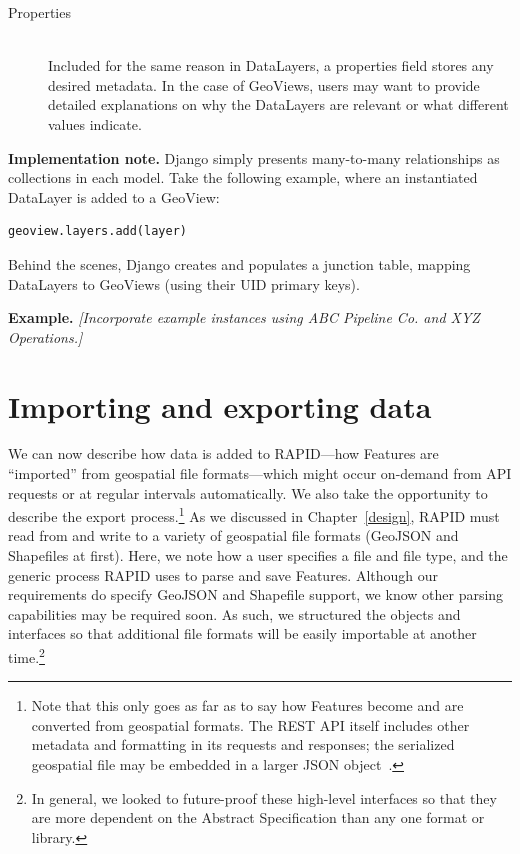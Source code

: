 \begin{description}
\item[Properties] \hfill \\
Included for the same reason in DataLayers, a properties field stores any desired metadata. In the case of GeoViews, users may want to provide detailed explanations on why the DataLayers are relevant or what different values indicate.

\end{description}

\textbf{Implementation note.} Django simply presents many-to-many relationships as collections in each model. Take the following example, where an instantiated DataLayer is added to a GeoView:

\begin{Verbatim}[samepage=true,baselinestretch=1,xleftmargin=12mm]
geoview.layers.add(layer)
\end{Verbatim}

Behind the scenes, Django creates and populates a junction table, mapping DataLayers to GeoViews (using their UID primary keys).

\textbf{Example.} \textit{[Incorporate example instances using ABC Pipeline Co. and XYZ Operations.]}

\section{Importing and exporting data}
We can now describe how data is added to RAPID---how Features are ``imported'' from geospatial file formats---which might occur on-demand from API requests or at regular intervals automatically. We also take the opportunity to describe the export process.\footnote{Note that this only goes as far as to say how Features become and are converted from geospatial formats. The REST API itself includes other metadata and formatting in its requests and responses; the serialized geospatial file may be embedded in a larger JSON object~\cite{Francis}.} As we discussed in Chapter~\ref{design}, RAPID must read from and write to a variety of geospatial file formats (GeoJSON and Shapefiles at first). Here, we note how a user specifies a file and file type, and the generic process RAPID uses to parse and save Features. Although our requirements do specify GeoJSON and Shapefile support, we know other parsing capabilities may be required soon. As such, we structured the objects and interfaces so that additional file formats will be easily importable at another time.\footnote{In general, we looked to future-proof these high-level interfaces so that they are more dependent on the Abstract Specification than any one format or library.}

